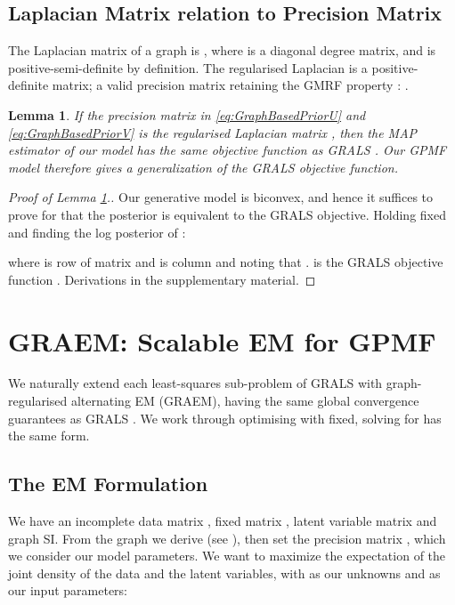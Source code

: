 \documentclass{article}
\theoremstyle{plain}
\newtheorem{lem}{Lemma}
\theoremstyle{definition}
\theoremstyle{remark}
\begin{document}
\subsection{Laplacian Matrix relation to Precision Matrix}  \label{sec:RegLaplaceMat} The Laplacian matrix of a graph is , where  is a diagonal degree matrix, and is positive-semi-definite by definition.  The regularised Laplacian  is a positive-definite matrix; a valid precision matrix retaining the GMRF property \cite{dong2016learning,egilmez2016graph,egilmez2017graph,hastie2009elements,liu2014bayesian}: .
\begin{lem} \label{lem:PosteriorEquivGRALS}
If the precision matrix in \eqref{eq:GraphBasedPriorU} and  \eqref{eq:GraphBasedPriorV} is the regularised Laplacian matrix , then the MAP estimator of our model has the same objective function as GRALS \cite{rao2015collaborative}. Our GPMF model therefore gives a generalization of the GRALS objective function.
\end{lem}
\begin{proof}[Proof of Lemma \ref{lem:PosteriorEquivGRALS}.]
Our generative model is biconvex, and hence it suffices to prove for 
 that the posterior is equivalent to the GRALS objective.
Holding  fixed and finding the log posterior of :

where  is row  of matrix  and  is column  and noting that .  is the GRALS objective function \cite{rao2015collaborative}. Derivations in the supplementary material.
\end{proof}

\section{GRAEM: Scalable EM for GPMF} \label{sec:TheEMAlgo}

We naturally extend each least-squares sub-problem of GRALS \cite{rao2015collaborative} with graph-regularised alternating EM (GRAEM), having the same global convergence guarantees as GRALS \cite{xu2013block}.  We work through optimising  with  fixed, solving for  has the same form.

\subsection{The EM Formulation}
We have an incomplete data matrix , fixed matrix , latent variable matrix  and graph SI. From the graph we derive  (see ), then set the precision matrix , which we consider our model parameters. We want to maximize the expectation of the joint density of the data and the latent variables, with  as our unknowns and  as our input parameters:
\end{document}
